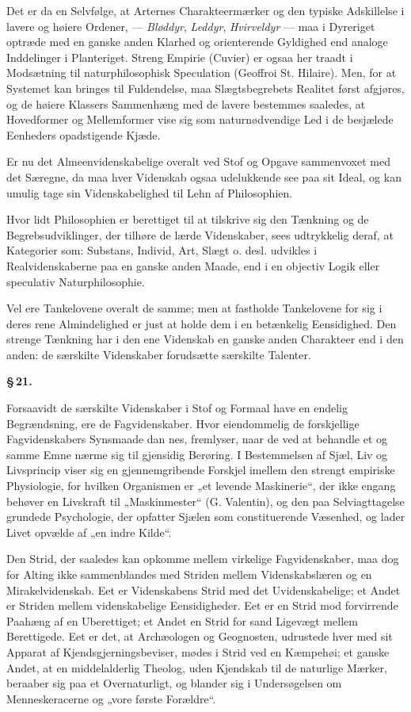 \documentclass[12pt]{book}
\newcommand{\opage}[1]{\marginnote{\footnotesize\textit{[#1]}}}
\begin{document}
Det er da en Selvfølge, at Arternes Charakteermærker og den typiske Adskillelse i lavere og
høiere Ordener, — \emph{Bløddyr}, \emph{Leddyr}, \emph{Hvirveldyr} — maa i Dyreriget optræde
med en ganske anden Klarhed og orienterende Gyldighed end analoge Inddelinger i Planteriget.
Streng Empirie (Cuvier) er ogsaa her traadt i Modsætning til naturphilosophisk Speculation
(Geoffroi St. Hilaire). Men, for at Systemet kan bringes til Fuldendelse, maa
Slægtsbegrebets Realitet først afgjøres, og de høiere Klassers Sammenhæng med de lavere
bestemmes saaledes, at Hovedformer og Mellemformer vise sig som naturnødvendige Led i de
besjælede Eenheders opadstigende Kjæde.

Er nu det Almeenvidenskabelige overalt ved Stof og Opgave sammenvoxet med det Særegne, da
maa hver Videnskab ogsaa udelukkende see paa sit Ideal, og kan umulig tage sin
Videnskabelighed til Lehn af Philosophien.

Hvor lidt Philosophien er berettiget til at tilskrive sig den Tænkning og de
Begrebsudviklinger, der tilhøre de lærde Videnskaber, sees udtrykkelig deraf, at Kategorier
som: Substans, Individ, Art, Slægt o. desl. udvikles i Realvidenskaberne paa en ganske anden
Maade, end i en objectiv Logik eller speculativ Naturphilosophie.

Vel ere Tankelovene overalt de samme; men at fastholde Tankelovene for sig i deres rene
Almindelighed er just at holde dem i en betænkelig Eensidighed. Den strenge Tænkning har i
den ene Videnskab en ganske anden Charakteer end i den anden: de særskilte Videnskaber
forudsætte særskilte Talenter.

\begin{center}{\bfseries \S\,21.}\end{center}

Forsaavidt de særskilte Videnskaber i Stof og Formaal have en endelig Begrændsning, ere de
Fagvidenskaber. Hvor eiendommelig de forskjellige Fagvidenskabers Synsmaade dan%
\opage{95}nes, fremlyser, naar de ved at behandle et og samme Emne nærme sig til gjensidig Berøring. I
Bestemmelsen af Sjæl, Liv og Livsprincip viser sig en gjennemgribende Forskjel imellem den
strengt empiriske Physiologie, for hvilken Organismen er „et levende Maskinerie“, der ikke
engang behøver en Livskraft til „Maskinmester“ (G. Valentin), og den paa Selviagttagelse
grundede Psychologie, der opfatter Sjælen som constituerende Væsenhed, og lader Livet
opvælde af „en indre Kilde“.

Den Strid, der saaledes kan opkomme mellem virkelige Fagvidenskaber, maa dog for Alting ikke
sammenblandes med Striden mellem Videnskabslæren og en Mirakelvidenskab. Eet er
Videnskabens Strid med det Uvidenskabelige; et Andet er Striden mellem videnskabelige
Eensidigheder. Eet er en Strid mod forvirrende Paahæng af en Uberettiget; et Andet en Strid
for sand Ligevægt mellem Berettigede. Eet er det, at Archæologen og Geognosten, udrustede
hver med sit Apparat af Kjendsgjerningsbeviser, mødes i Strid ved en Kæmpehøi; et ganske
Andet, at en middelalderlig Theolog, uden Kjendskab til de naturlige Mærker, beraaber sig
paa et Overnaturligt, og blander sig i Undersøgelsen om Menneskeracerne og „vore første
Forældre“.
\end{document}
